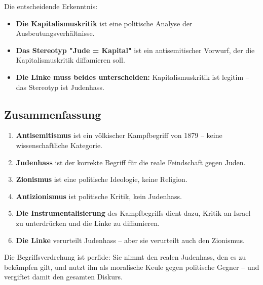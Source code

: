 Die entscheidende Erkenntnis:

\begin{itemize}
    \item \textbf{Die Kapitalismuskritik} ist eine politische Analyse der Ausbeutungsverhältnisse.
    \item \textbf{Das Stereotyp "Jude = Kapital"} ist ein antisemitischer Vorwurf, der die Kapitalismuskritik diffamieren soll.
    \item \textbf{Die Linke muss beides unterscheiden:} Kapitalismuskritik ist legitim – das Stereotyp ist Judenhass.
\end{itemize}

\subsection{Zusammenfassung}

\begin{enumerate}
    \item \textbf{Antisemitismus} ist ein völkischer Kampfbegriff von 1879 – keine wissenschaftliche Kategorie.
    \item \textbf{Judenhass} ist der korrekte Begriff für die reale Feindschaft gegen Juden.
    \item \textbf{Zionismus} ist eine politische Ideologie, keine Religion.
    \item \textbf{Antizionismus} ist politische Kritik, kein Judenhass.
    \item \textbf{Die Instrumentalisierung} des Kampfbegriffs dient dazu, Kritik an Israel zu unterdrücken und die Linke zu diffamieren.
    \item \textbf{Die Linke} verurteilt Judenhass – aber sie verurteilt auch den Zionismus.
\end{enumerate}

Die Begriffsverdrehung ist perfide: Sie nimmt den realen Judenhass, den es zu bekämpfen gilt, und nutzt ihn als moralische Keule gegen politische Gegner – und vergiftet damit den gesamten Diskurs.